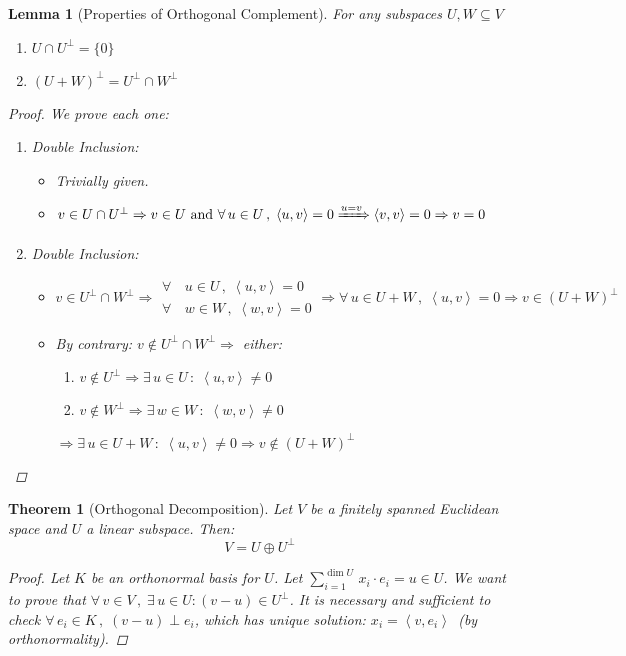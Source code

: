 \documentclass[12pt]{article}
\let\RA\Rightarrow
\newcommand{\Forall}[1]{\forall\,{#1}\,,\;}
\newcommand{\Exist}[1]{\exists\,{#1}\,:\;}
\newcommand{\inner}[2]{\left\langle{#1},{#2}\right\rangle}
\newtheorem{theorem}{Theorem}[subsection]
\newtheorem{lemma}{Lemma}[subsection]
\begin{document}
\begin{lemma}[Properties of Orthogonal Complement]
  For any subspaces $U,W\subseteq V$
  \begin{enumerate}
    \item $U\cap U^\perp=\{0\}\,$
    \item $(U+W)^\perp=U^\perp\cap W^\perp$
  \end{enumerate}
  \begin{proof}
    We prove each one:
    \begin{enumerate}
      \item Double Inclusion:
      \begin{itemize}
        \item[$(\supseteq)$] Trivially given.
        \item[$(\subseteq)$] $v\in U\cap U^\perp\RA v\in U \text{ and }\forall\,u\in U\,,\; \inner{u}{v}=0\xRightarrow{u=v}\inner{v}{v}=0\RA v=0$
      \end{itemize}
      \item Double Inclusion:
      \begin{itemize}
        \item[$(\supseteq)$] $v\in U^\perp\cap W^\perp\RA \begin{aligned}\forall\,&u\in U\,,\; \inner{u}{v}=0\\\forall\,&w\in W\,,\; \inner{w}{v}=0\end{aligned}\RA \forall\,u\in U+W\,,\;\inner{u}{v}=0\RA v\in (U+W)^\perp$
        \item[$(\subseteq)$] By contrary: $v\notin U^\perp\cap W^\perp\RA$ either:
        \begin{enumerate}
          \item $v\notin U^\perp \RA\Exist{u\in U}\inner{u}{v}\neq 0$
          \item $v\notin W^\perp \RA\Exist{w\in W}\inner{w}{v}\neq 0$
        \end{enumerate}
        $\RA\Exist{u\in U+W}\inner{u}{v}\neq 0\RA v\notin (U+W)^\perp$
      \end{itemize}
    \end{enumerate}
  \end{proof}
\end{lemma}

\begin{theorem}[Orthogonal Decomposition]
  Let $V$ be a finitely spanned Euclidean space and $U$ a linear subspace. Then: $$V=U\oplus U^\perp$$
  \begin{proof}
    Let $K$ be an orthonormal basis for $U$. Let $\displaystyle\sum_{i=1}^{\dim U}\,x_i\cdot e_i=u\in U$. We want to prove that $\forall\,v\in V\,,\;\exists\,u\in U: (v-u)\in U^\perp$. It is necessary and sufficient to check $\Forall{e_i\in K} (v-u)\perp e_i$, which has unique solution: $x_i=\inner{v}{e_i}\,$ (by orthonormality).
  \end{proof}
\end{theorem}
\end{document}

